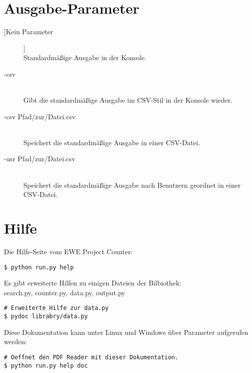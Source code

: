 \documentclass[a4paper,12pt]{report}
\begin{document}
	\section{Ausgabe-Parameter}
	\begin{description}
  	\item[[Kein Parameter]] \hfill \\
  	Standardmäßige Ausgabe in der Konsole.
  	\item[-csv] \hfill \\
  	Gibt die standardmäßige Ausgabe im CSV-Stil in der Konsole wieder.
  	\item[-csv Pfad/zur/Datei.csv] \hfill \\
  	Speichert die standardmäßige Ausgabe in einer CSV-Datei.
  	\item[-usr Pfad/zur/Datei.csv] \hfill \\
  	Speichert die standardmäßige Ausgabe nach Benutzern geordnet in einer CSV-Datei.
	\end{description}
	\newpage

	\section{Hilfe}
	Die Hilfe-Seite vom EWE Project Counter:
	\begin{lstlisting}
$ python run.py help
	\end{lstlisting}	
	\vspace{5mm}	
	Es gibt erweiterte Hilfen zu einigen Dateien der Bilbiothek:\\
	search.py, counter.py, data.py, output.py
	\begin{lstlisting}
# Erweiterte Hilfe zur data.py
$ pydoc librabry/data.py 
	\end{lstlisting}	
	\vspace{5mm}	
	Diese Dokumentation kann unter Linux und Windows über Parameter aufgerufen werden:
	\begin{lstlisting}
# Oeffnet den PDF Reader mit dieser Dokumentation.
$ python run.py help doc
	\end{lstlisting}	
		
\end{document}
